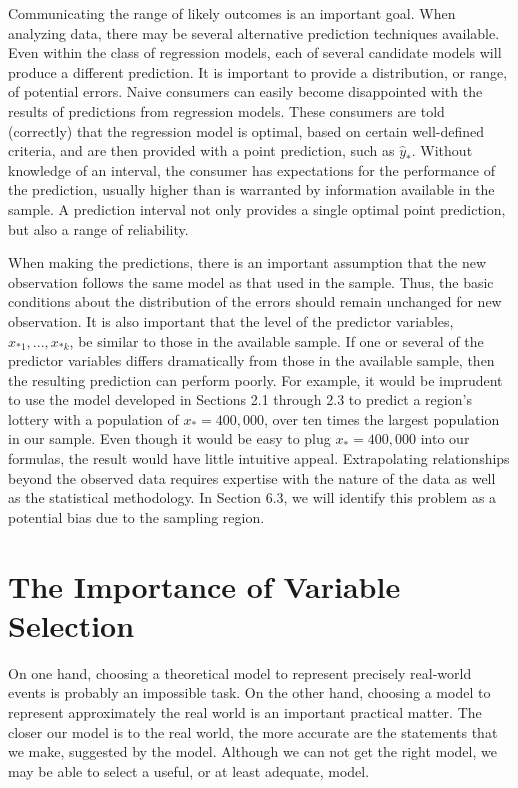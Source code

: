 Communicating the range of likely outcomes is an important goal.
When analyzing data, there may be several alternative prediction
techniques available. Even within the class of regression models,
each of several candidate models will produce a different
prediction. It is important to provide a distribution, or range, of
potential errors. Naive consumers can easily become disappointed
with the results of predictions from regression models. These
consumers are told (correctly) that the regression model is optimal,
based on certain well-defined criteria, and are then provided with a
point prediction, such as $\hat{y}_{\ast}$. Without knowledge of an
interval, the consumer has expectations for the performance of the
prediction, usually higher than is warranted by information
available in the sample. A prediction interval not only provides a
single optimal point prediction, but also a range of reliability.

When making the predictions, there is an important assumption that
the new observation follows the same model as that used in the
sample. Thus, the basic conditions about the distribution of the
errors should remain unchanged for new observation. It is also
important that the level of the predictor variables, $x_{\ast
1},...,x_{\ast k}$, be similar to those in the available sample. If
one or several of the predictor variables differs dramatically from
those in the available sample, then the resulting prediction can
perform poorly. For example, it would be imprudent to use the model
developed in Sections 2.1 through 2.3 to predict a region's lottery
with a population of $x_{\ast}=400,000$, over ten times the largest
population in our sample. Even though it would be easy to plug
$x_{\ast}=400,000$ into our formulas, the result would have little
intuitive appeal. Extrapolating relationships beyond the observed
data requires expertise with the nature of the data as well as the
statistical methodology. In Section 6.3, we will identify this
problem as a potential bias due to the sampling region.

\section{The Importance of Variable Selection}

On one hand, choosing a theoretical model to represent precisely
real-world events is probably an impossible task. On the other hand,
choosing a model to represent approximately the real world is an
important practical matter. The closer our model is to the real
world, the more accurate are the statements that we make, suggested
by the model. Although we can not get the right model, we may be
able to select a useful, or at least adequate, model.

